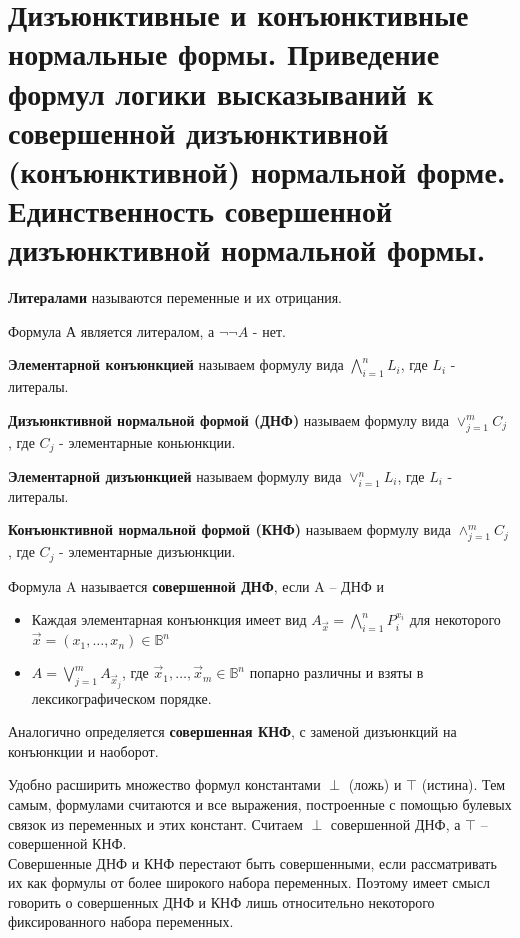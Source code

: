 \section{Дизъюнктивные и конъюнктивные нормальные формы. Приведение формул логики высказываний к совершенной
дизъюнктивной (конъюнктивной) нормальной форме. Единственность совершенной дизъюнктивной
нормальной формы.}

\begin{definition}
	\textbf{Литералами} называются переменные и их отрицания.
\end{definition}
\begin{example}
	Формула А является литералом, а $ \neg\neg A$ - нет.
\end{example}

\begin{definition}
	\textbf{Элементарной конъюнкцией} называем формулу вида $\bigwedge^{n}_{i=1}L_{i}$, где $ L_{i} $ - литералы.

	\textbf{Дизъюнктивной нормальной формой (ДНФ)} называем формулу вида $\vee^{m}_{j=1}C_{j}$ , где $ C_{j} $ -
	элементарные коньюнкции.

	\textbf{Элементарной дизъюнкцией} называем формулу вида
	$\vee^{n}_{i=1}L_{i}$, где $ L_{i} $ - литералы.  

	\textbf{Конъюнктивной нормальной формой (КНФ)} называем формулу вида $\wedge^{m}_{j=1}C_{j}$ , где $ C_{j} $ -
	элементарные дизъюнкции.
\end{definition}

\begin{definition}
	Формула A называется \textbf{совершенной ДНФ}, если A -- ДНФ и 
	\begin{itemize}
		\item Каждая элементарная конъюнкция имеет вид 
			$ A_{\vec{x}}=\bigwedge_{i=1}^{n} P_{i}^{x_{i}} $
			для некоторого\\$\vec{x} = (x_1,\ldots,x_n) \in \mathbb{B}^n$ 
		\item $A=\bigvee_{j=1}^m A_{\vec{x}_j}$, где $\vec{x}_1,\ldots,\vec{x}_m \in \mathbb{B}^{n}$ попарно
			различны и взяты в лексикографическом порядке.
	\end{itemize}
	Аналогично определяется \textbf{совершенная КНФ}, с заменой дизъюнкций
	на конъюнкции и наоборот.
\end{definition}
\begin{remark} 
	Удобно расширить множество формул константами
	$\perp$ (ложь) и $\top$ (истина). Тем самым, формулами считаются и все выражения, построенные с помощью булевых
	связок из переменных и этих констант. Считаем $\perp$ совершенной ДНФ, а $\top$ -- совершенной КНФ.\\
	Совершенные ДНФ и КНФ перестают быть совершенными, если рассматривать их как формулы от более широкого набора
	переменных. Поэтому имеет смысл говорить о совершенных ДНФ и КНФ лишь относительно некоторого фиксированного
	набора переменных.
\end{remark}

